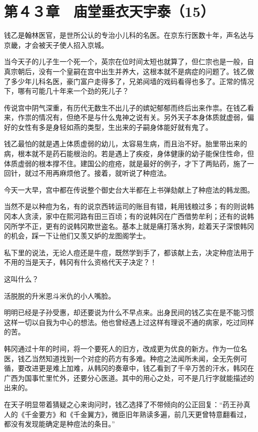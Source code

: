 \section{第４３章　庙堂垂衣天宇泰（15）}

钱乙是翰林医官，是世所公认的专治小儿科的名医。在京东行医数十年，声名达与京畿，才会被天子使人招入京城。

当今天子的儿子生一个死一个，英宗在位时间太短也就算了，但仁宗也是一般，自真宗朝后，没有一个皇嗣在宫中出生并养大，这根本就不是病症的问题了。钱乙做了多少年儿科名医，豪门富户走得多了，兄弟阋墙的戏码看得也多了。正常的情况下，哪有可能几十年来一个劲的死儿子？

传说宫中阴气深重，有历代无数生不出儿子的嫔妃郁郁而终后出来作祟。在钱乙看来，作祟的情况有，但绝不是与什么鬼神之说有关。另外天子本身体质就虚弱，偏好的女性有多是身轻如燕的类型，生出来的子嗣身体能好就有鬼了。

钱乙最怕的就是遇上体质虚弱的幼儿，太容易生病，而且治不好。胎里带出来的病，根本就不是药石能根治的。若是遇上了疾疫，身体健康的幼子能保住性命，但体质虚弱的根本撑不住。建国公的痘疮，就是最好的例子，才下了两贴药，施了一回针，就过不用再麻烦他了。接着，就听说了种痘法。

今天一大早，宫中都在传说整个御史台大半都在上书弹劾献上了种痘法的韩龙图。

当然不是以种痘为名，有的说京西转运司的账目有错，耗用钱粮过多；有的则说韩冈本人贪渎，家中在熙河路有田三百顷；有的说韩冈在广西借势牟利；还有的说韩冈所学不正，更有的说韩冈欺世盗名。基本上就是痛打落水狗，趁着天子深恨韩冈的机会，踩一下让他们又羡又妒的龙图阁学士。

私下里的说法，无论人痘还是牛痘，既然学到手了，都该献上去，决定种痘法用于不用的当是天子，韩冈有什么资格代天子决定？！

这叫什么？

活脱脱的升米恩斗米仇的小人嘴脸。

明明已经是子孙受惠，却还要说为什么不早点来。出身民间的钱乙实在是不能习惯这样一切以自我为中心的想法。他也曾经遇上过这样有理说不通的病家，吃过同样的苦。

韩冈通过十年的时间，将一个要死人的旧方，改成更为优良的新方。作为一位名医，钱乙当然知道找到一个对症的药方有多难。种痘之法闻所未闻，全无先例可循，要改进更是难上加难，从韩冈的奏章中，钱乙看到了千辛万苦的汗水，韩冈在广西为国事忙里忙外，还要分心医道。其中的用心之处，可不是几行字就能描述的出来的。

在天子明显带着猜疑之心来询问时，钱乙选择了不带倾向的公正回复：“药王孙真人的《千金要方》和《千金翼方》，微臣旧年熟读多遍，前几天更曾特意翻看过，都没有发现能确定是种痘法的条目。”

